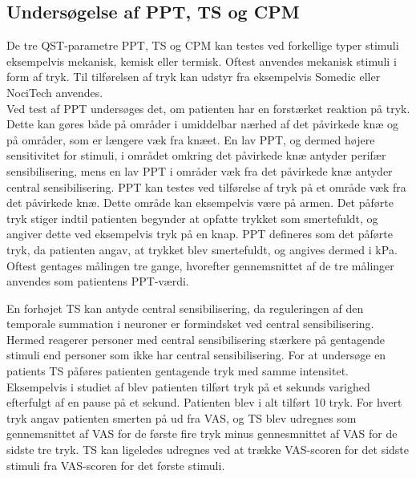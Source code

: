 \subsection{Undersøgelse af PPT, TS og CPM}
De tre QST-parametre PPT, TS og CPM kan testes ved forkellige typer stimuli eksempelvis mekanisk, kemisk eller termisk. Oftest anvendes mekanisk stimuli i form af tryk. \citep{Suokas2012} Til tilførelsen af tryk kan udstyr fra eksempelvis Somedic eller NociTech anvendes. \citep{Wylde2015} \citep{Petersen2016} \\
Ved test af PPT undersøges det, om patienten har en forstærket reaktion på tryk. Dette kan gøres både på områder i umiddelbar nærhed af det påvirkede knæ og på områder, som er længere væk fra knæet. En lav PPT, og dermed højere sensitivitet for stimuli, i området omkring det påvirkede knæ antyder perifær sensibilisering, mens en lav PPT i områder væk fra det påvirkede knæ antyder central sensibilisering. \citep{Suokas2012} PPT kan testes ved tilførelse af tryk på et område væk fra det påvirkede knæ. Dette område kan eksempelvis være på armen. Det påførte tryk stiger indtil patienten begynder at opfatte trykket som smertefuldt, og angiver dette ved eksempelvis tryk på en knap. PPT defineres som det påførte tryk, da patienten angav, at trykket blev smertefuldt, og angives dermed i kPa. Oftest gentages målingen tre gange, hvorefter gennemsnittet af de tre målinger anvendes som patientens PPT-værdi. \citep{Petersen2015b} \citep{Wylde2015} 

En forhøjet TS kan antyde central sensibilisering, da reguleringen af den temporale summation i neuroner er formindsket ved central sensibilisering. Hermed reagerer personer med central sensibilisering stærkere på gentagende stimuli end personer som ikke har central sensibilisering. \citep{Arendt-Nielsen2015} For at undersøge en patients TS påføres patienten gentagende tryk med samme intensitet. Eksempelvis i studiet af \citep{Petersen2016} blev patienten tilført tryk på et sekunds varighed efterfulgt af en pause på et sekund. Patienten blev i alt tilført 10 tryk. For hvert tryk angav patienten smerten på ud fra VAS, og TS blev udregnes som gennemsnittet af VAS for de første fire tryk minus gennesmnittet af VAS for de sidste tre tryk. \citep{Petersen2016} TS kan ligeledes udregnes ved at trække VAS-scoren for det sidste stimuli fra VAS-scoren for det første stimuli. \citep{Petersen2015b} 

